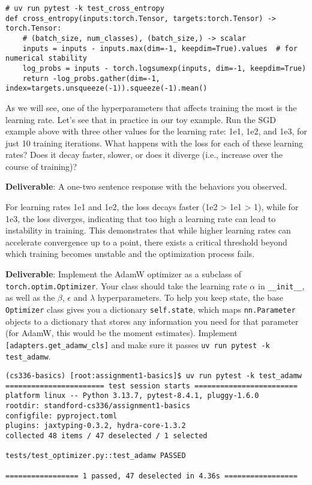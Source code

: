 \begin{lstlisting}
# uv run pytest -k test_cross_entropy
def cross_entropy(inputs:torch.Tensor, targets:torch.Tensor) -> torch.Tensor:
    # (batch_size, num_classes), (batch_size,) -> scalar
    inputs = inputs - inputs.max(dim=-1, keepdim=True).values  # for numerical stability
    log_probs = inputs - torch.logsumexp(inputs, dim=-1, keepdim=True)
    return -log_probs.gather(dim=-1, index=targets.unsqueeze(-1)).squeeze(-1).mean()
\end{lstlisting}


As we will see, one of the hyperparameters that affects training the most is the learning rate. Let's see that in practice in our toy example. Run the SGD example above with three other values for the learning rate: 1e1, 1e2, and 1e3, for just 10 training iterations. What happens with the loss for each of these learning rates? Does it decay faster, slower, or does it diverge (i.e., increase over the course of training)?

\textbf{Deliverable}: A one-two sentence response with the behaviors you observed.

\begin{answer}
For learning rates 1e1 and 1e2, the loss decays faster (1e2 > 1e1 > 1), while for 1e3, the loss diverges, indicating that too high a learning rate can lead to instability in training. This demonstrates that while higher learning rates can accelerate convergence up to a point, there exists a critical threshold beyond which training becomes unstable and the optimization process fails.
\end{answer}


\textbf{Deliverable}: Implement the AdamW optimizer as a subclass of \lstinline{torch.optim.Optimizer}. Your class should take the learning rate $\alpha$ in \lstinline{__init__}, as well as the $\beta$, $\epsilon$ and $\lambda$ hyperparameters. To help you keep state, the base \lstinline{Optimizer} class gives you a dictionary \lstinline{self.state}, which maps \lstinline{nn.Parameter} objects to a dictionary that stores any information you need for that parameter (for AdamW, this would be the moment estimates). Implement \lstinline{[adapters.get_adamw_cls]} and make sure it passes \lstinline{uv run pytest -k test_adamw}.

\begin{lstlisting}
(cs336-basics) [root:assignment1-basics]$ uv run pytest -k test_adamw
======================= test session starts ========================
platform linux -- Python 3.13.7, pytest-8.4.1, pluggy-1.6.0
rootdir: standford-cs336/assignment1-basics
configfile: pyproject.toml
plugins: jaxtyping-0.3.2, hydra-core-1.3.2
collected 48 items / 47 deselected / 1 selected                    

tests/test_optimizer.py::test_adamw PASSED

================= 1 passed, 47 deselected in 4.36s =================
\end{lstlisting}

